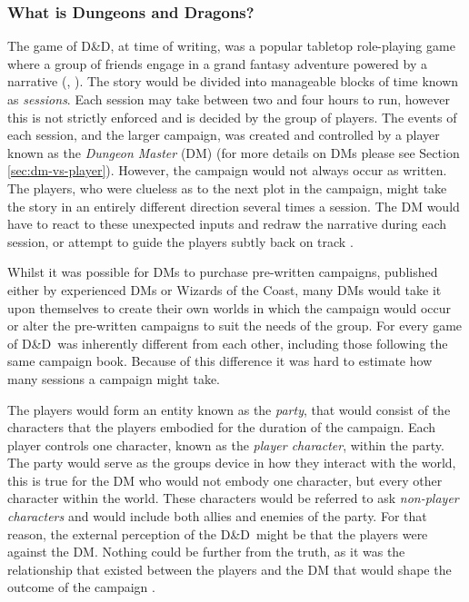 \documentclass[final]{cmpreport}
\newcommand{\WotC}{Wizards of the Coast}
\newcommand{\dnd}{D\&D}
\begin{document}
			\subsubsection{What is Dungeons and Dragons?} \label{sec:what-dnd}
			The game of \dnd, at time of writing, was a popular tabletop role-playing game where a group of friends engage in a grand fantasy adventure powered by a narrative (\cite{DnDOriginal}, \cite{DnDHistory}). The story would be divided into manageable blocks of time known as \emph{sessions}. Each session may take between two and four hours to run, however this is not strictly enforced and is decided by the group of players. The events of each session, and the larger campaign, was created and controlled by a player known as the \emph{Dungeon Master} (DM) (for more details on DMs please see Section \ref{sec:dm-vs-player}). However, the campaign would not always occur as written. The players, who were clueless as to the next plot in the campaign, might take the story in an entirely different direction several times a session. The DM would have to react to these unexpected inputs and redraw the narrative during each session, or attempt to guide the players subtly back on track \citep{PlayerHandbook}. 
			
			Whilst it was possible for DMs to purchase pre-written campaigns, published either by experienced DMs or \WotC, many DMs would take it upon themselves to create their own worlds in which the campaign would occur or alter the pre-written campaigns to suit the needs of the group. For every game of \dnd \ was inherently different from each other, including those following the same campaign book. Because of this difference it was hard to estimate how many sessions a campaign might take. 
			
			The players would form an entity known as the \emph{party}, that would consist of the characters that the players embodied for the duration of the campaign. Each player controls one character, known as the \emph{player character}, within the party. The party would serve as the groups device in how they interact with the world, this is true for the DM who would not embody one character, but every other character within the world. These characters would be referred to ask \emph{non-player characters} and would include both allies and enemies of the party. For that reason, the external perception of the \dnd \ might be that the players were against the DM. Nothing could be further from the truth, as it was the relationship that existed between the players and the DM that would shape the outcome of the campaign \citep{DnDPeople}.
			
\end{document}
